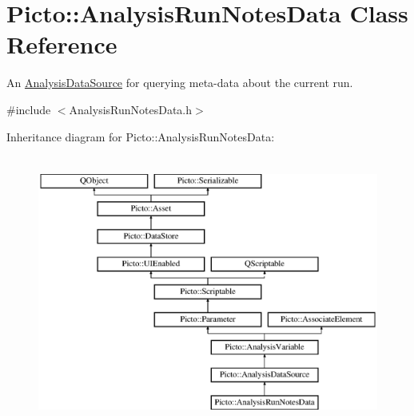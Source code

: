\hypertarget{class_picto_1_1_analysis_run_notes_data}{\section{Picto\-:\-:Analysis\-Run\-Notes\-Data Class Reference}
\label{class_picto_1_1_analysis_run_notes_data}
}


An \hyperlink{class_picto_1_1_analysis_data_source}{Analysis\-Data\-Source} for querying meta-\/data about the current run.  




{\ttfamily \#include $<$Analysis\-Run\-Notes\-Data.\-h$>$}

Inheritance diagram for Picto\-:\-:Analysis\-Run\-Notes\-Data\-:\begin{figure}[H]
\begin{center}
\leavevmode
\includegraphics[height=9.000000cm]{class_picto_1_1_analysis_run_notes_data}
\end{center}
\end{figure}
